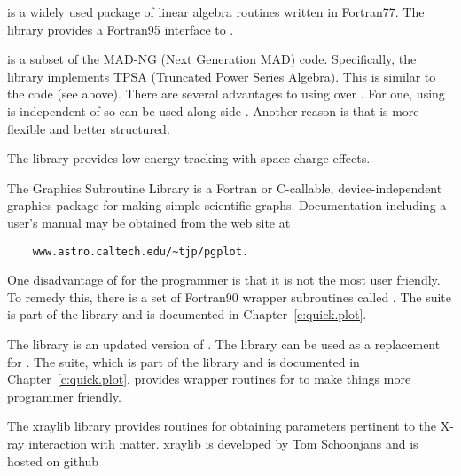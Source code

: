 {{{{{{\begin{description}
  \item[lapack / lapack95] \Newline
{} is a widely used package of linear algebra routines written in Fortran77. The
 library provides a Fortran95 interface to .
%
  \item[mad_tpsa] \Newline
{} is a subset of the MAD-NG (Next Generation MAD) code\cite{b:mad.ng}. Specifically, the
 library implements TPSA (Truncated Power Series Algebra). This is similar to the
 code (see above). There are several advantages to using  over . For one, using
 is independent of  so  can be used along side . Another
reason is that  is more flexible and better structured.
%
  \item[open_spacecharge] \Newline
The  library provides low energy tracking with space charge effects.
%
  \item[PGPLOT] \Newline
The  Graphics Subroutine Library is a Fortran or C-callable, device-independent graphics
package for making simple scientific graphs. Documentation including a user's manual may be obtained
from the  web site at
\begin{verbatim}
    www.astro.caltech.edu/~tjp/pgplot.
\end{verbatim} 
One disadvantage of  for the programmer is that it is not the most user friendly. To
remedy this, there is a set of Fortran90 wrapper subroutines called .  The
 suite is part of the  library and is documented in
Chapter~\ref{c:quick.plot}.
%
  \item[plplot] \Newline
The  library is an updated version of . The  library can be used as
a replacement for . The  suite, which is part of the 
library and is documented in Chapter~\ref{c:quick.plot}, provides wrapper routines for 
to make things more programmer friendly.
%
  \item[xraylib] \Newline
The xraylib library provides routines for obtaining parameters pertinent to the X-ray interaction
with matter. xraylib is developed by Tom Schoonjans and is hosted on github\cite{b:xraylib}

\end{description}

}}}}}}
